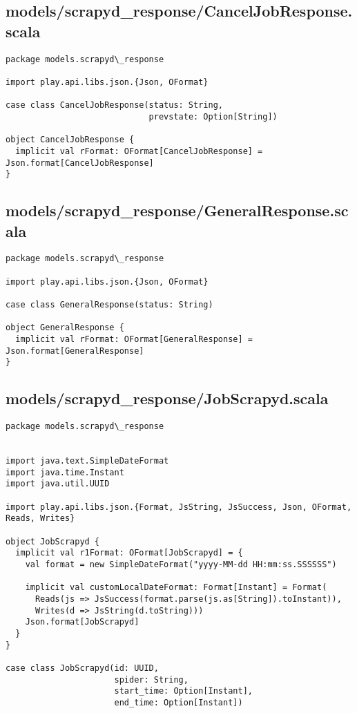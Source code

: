 \subsection{models/scrapyd\_response/CancelJobResponse.scala}
\begin{lstlisting}
package models.scrapyd\_response

import play.api.libs.json.{Json, OFormat}

case class CancelJobResponse(status: String,
                             prevstate: Option[String])

object CancelJobResponse {
  implicit val rFormat: OFormat[CancelJobResponse] = Json.format[CancelJobResponse]
}\end{lstlisting}
\subsection{models/scrapyd\_response/GeneralResponse.scala}
\begin{lstlisting}
package models.scrapyd\_response

import play.api.libs.json.{Json, OFormat}

case class GeneralResponse(status: String)

object GeneralResponse {
  implicit val rFormat: OFormat[GeneralResponse] = Json.format[GeneralResponse]
}
\end{lstlisting}
\subsection{models/scrapyd\_response/JobScrapyd.scala}
\begin{lstlisting}
package models.scrapyd\_response


import java.text.SimpleDateFormat
import java.time.Instant
import java.util.UUID

import play.api.libs.json.{Format, JsString, JsSuccess, Json, OFormat, Reads, Writes}

object JobScrapyd {
  implicit val r1Format: OFormat[JobScrapyd] = {
    val format = new SimpleDateFormat("yyyy-MM-dd HH:mm:ss.SSSSSS")

    implicit val customLocalDateFormat: Format[Instant] = Format(
      Reads(js => JsSuccess(format.parse(js.as[String]).toInstant)),
      Writes(d => JsString(d.toString)))
    Json.format[JobScrapyd]
  }
}

case class JobScrapyd(id: UUID,
                      spider: String,
                      start_time: Option[Instant],
                      end_time: Option[Instant])
\end{lstlisting}
